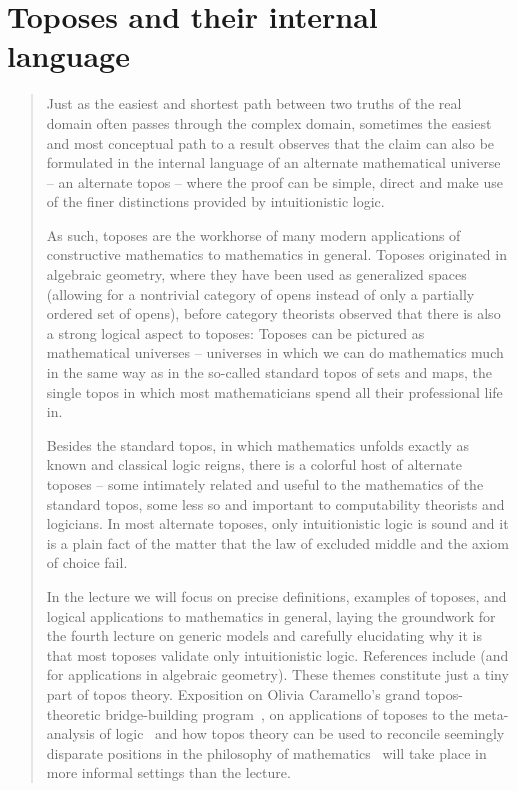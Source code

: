 \documentclass[10pt,reqno,a4paper,openany]{amsbook}
\theoremstyle{definition}
\theoremstyle{plain}
\theoremstyle{remark}
\newcommand{\?}{\,{:}\,}
\renewcommand{\_}{\mathpunct{.}\,}
\newenvironment{intro}{\begin{quote}}{\end{quote}\bigskip\noindent}
\begin{document}
\chapter{Toposes and their internal language}
\label{lect:toposes}

\begin{intro}
Just as the easiest and shortest path between two truths of the real domain
often passes through the complex domain, sometimes the easiest and most
conceptual path to a result observes that the claim can also be formulated in
the internal language of an alternate mathematical universe -- an alternate
topos -- where the proof can be simple, direct and make use of the finer
distinctions provided by intuitionistic logic.

As such, toposes are the workhorse of many modern applications of constructive
mathematics to mathematics in general. Toposes originated in algebraic
geometry, where they have been used as generalized spaces (allowing for a
nontrivial category of opens instead of only a partially ordered set of opens),
before category theorists observed that there is also a strong logical aspect
to toposes: Toposes can be pictured as mathematical universes -- universes in
which we can do mathematics much in the same way as in the so-called standard
topos of sets and maps, the single topos in which most mathematicians spend all
their professional life in.

Besides the standard topos, in which mathematics unfolds exactly as known and
classical logic reigns, there is a colorful host of alternate toposes -- some
intimately related and useful to the mathematics of the standard topos, some
less so and important to computability theorists and logicians. In most
alternate toposes, only intuitionistic logic is sound and it is a plain fact of
the matter that the law of excluded middle and the axiom of choice fail.

In the lecture we will focus on precise definitions, examples of toposes, and
logical applications to mathematics in general, laying the groundwork for the
fourth lecture on generic models and carefully elucidating why it is that most
toposes validate only intuitionistic logic. References include
\cite{blechschmidt:filmat,leinster:introduction,streicher:ctcl,moerdijk-maclane:sheaves-logic,goldblatt:topoi,johnstone:elephant}
(and \cite{blechschmidt:phd} for applications in algebraic geometry). These
themes constitute just a tiny part of topos theory. Exposition on Olivia
Caramello's grand topos-theoretic bridge-building program~\cite{caramello:tst},
on applications of toposes to the meta-analysis of
logic~\cite{lambek-scott:hocl} and how topos theory can be used to reconcile
seemingly disparate positions in the philosophy of
mathematics~\cite{lambek:incompatible,couture-lambek:reflections} will take
place in more informal settings than the lecture.
\end{intro}
\end{document}
